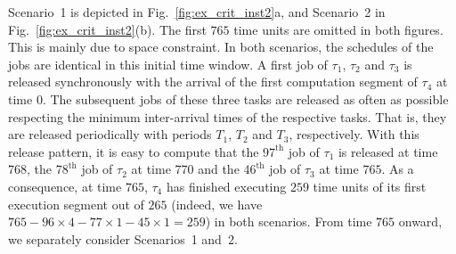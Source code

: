 Scenario~1 is depicted in Fig.~\ref{fig:ex_crit_inst2}a, and Scenario~2 in Fig.~\ref{fig:ex_crit_inst2}(b). The first $765$ time units are omitted in both figures. This is mainly due to space constraint. In both scenarios, the schedules of the jobs are identical in this initial time window.  
A first job of $\tau_1$, $\tau_2$ and $\tau_3$ is released synchronously with the arrival of the first computation segment of $\tau_4$ at time $0$. The subsequent jobs of these three tasks are released as often as possible respecting the minimum inter-arrival times of the respective tasks. That is, they are released periodically with periods $T_1$, $T_2$ and $T_3$, respectively. With this release pattern, it is easy to compute that the $97^\text{th}$ job of $\tau_1$ is released at time $768$, the $78^\text{th}$ job of $\tau_2$ at time $770$ and the $46^\text{th}$ job of $\tau_3$ at time $765$. As a consequence, at time $765$, $\tau_4$ has finished executing $259$ time units of its first execution segment out of $265$ (indeed, we have $765 - 96 \times 4 - 77 \times 1 - 45 \times 1 = 259$) in both scenarios. From time $765$ onward, we separately consider Scenarios~1 and~2.

